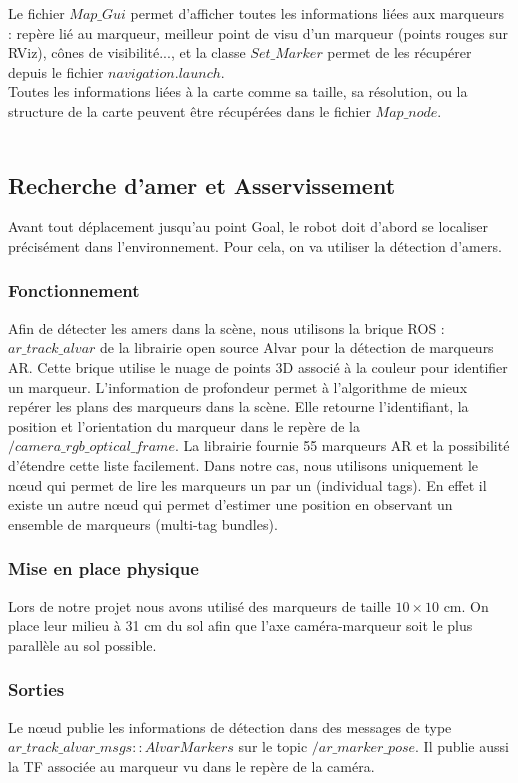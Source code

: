 \documentclass[10pt,a4paper]{article}
\begin{document}
Le fichier $Map\_Gui$ permet d'afficher toutes les informations liées aux marqueurs : repère lié au marqueur, meilleur point de visu d'un marqueur (points rouges sur RViz), cônes de visibilité..., et la classe $Set\_Marker$ permet de les récupérer depuis le fichier $navigation.launch$.\\
Toutes les informations liées à la carte comme sa taille, sa résolution, ou la structure de la carte peuvent être récupérées dans le fichier $Map\_node$.\\\\


\subsection{Recherche d'amer et Asservissement}
\label{sec:recherche}

Avant tout déplacement jusqu'au point Goal, le robot doit d'abord se localiser précisément dans l'environnement. Pour cela, on va utiliser la détection d'amers.

\subsubsection{Fonctionnement}
Afin de détecter les amers dans la scène, nous utilisons la brique ROS : $ar\_track\_alvar$ de la librairie open source Alvar pour la détection de marqueurs AR.
Cette brique utilise le nuage de points 3D associé à la couleur pour identifier un marqueur. L'information de profondeur permet à l'algorithme de mieux repérer les plans des marqueurs dans la scène. Elle retourne l'identifiant, la position et l'orientation du marqueur dans le repère de la $/camera\_rgb\_optical\_frame$. La librairie fournie 55 marqueurs AR et la possibilité d'étendre cette liste facilement. Dans notre cas, nous utilisons uniquement le nœud qui permet de lire les marqueurs un par un (individual tags). En effet il existe un autre nœud qui permet d'estimer une position en observant un ensemble de marqueurs (multi-tag bundles).

\subsubsection{Mise en place physique} 
Lors de notre projet nous avons utilisé des marqueurs de taille $10 \times 10$ cm. On place leur milieu à 31 cm du sol afin que l'axe caméra-marqueur soit le plus parallèle au sol possible.

\subsubsection{Sorties}
Le nœud publie les informations de détection dans des messages de type $ar\_track\_alvar\_msgs::AlvarMarkers$ sur le topic $/ar\_marker\_pose$. Il publie aussi la TF associée au marqueur vu dans le repère de la caméra.
	
\end{document}
